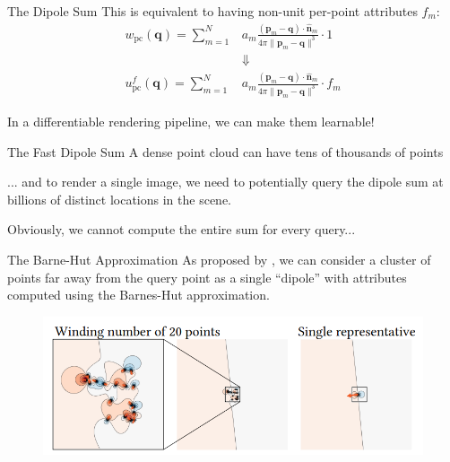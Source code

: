 \documentclass[10pt]{beamer}
\newcommand{\bp}{\mathbf{p}}
\newcommand{\bq}{\mathbf{q}}
\newcommand{\bn}{\mathbf{n}}
\begin{document}
\begin{frame}{The Dipole Sum}
    This is equivalent to having non-unit \alert{per-point} attributes \(f_m\):
    \begin{align*}
        w_{\mathrm{pc}}(\bq) = \sum_{m=1}^{N} &a_m \frac{(\bp_m - \bq)\cdot \widehat{\bn}_m}{4\pi\|\bp_m - \bq\|^3} \cdot 1 \\
        &\Downarrow \\
        u^f_{\mathrm{pc}}(\bq) = \sum_{m=1}^{N} &a_m \frac{(\bp_m - \bq) \cdot \widehat{\bn}_m}{4\pi \|\bp_m - \bq\|^3} \cdot f_m
    \end{align*}

    In a differentiable rendering pipeline, we can make them learnable!
\end{frame}

\begin{frame}{The \alert{Fast} Dipole Sum}
    A dense point cloud can have tens of thousands of points
    
    ... and to render a single image, we need to potentially query the dipole sum at billions of distinct locations in the scene.

    Obviously, we cannot compute the entire sum for every query...
\end{frame}

\begin{frame}{The Barne-Hut Approximation}
    As proposed by \citet{Barill:FW:2018}, we can consider a cluster of points far away from the query point as a single ``dipole'' with attributes computed using the \alert{Barnes-Hut approximation}.

    \begin{figure}
        \centering
        \includegraphics[width=0.9\linewidth]{figures/wn/barne_hut.png}
    \end{figure}
\end{frame}
\end{document}
